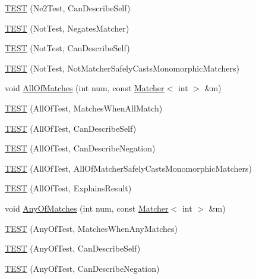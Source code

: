 \begin{DoxyCompactItemize}
\item 
\hyperlink{namespacetesting_1_1gmock__matchers__test_acedf2eda13385067ee70bdb7d6073427}{T\+E\+ST} (Ne2\+Test, Can\+Describe\+Self)
\item 
\hyperlink{namespacetesting_1_1gmock__matchers__test_ab41b57eeaea5568064b6ed3725316c73}{T\+E\+ST} (Not\+Test, Negates\+Matcher)
\item 
\hyperlink{namespacetesting_1_1gmock__matchers__test_a831db2bf90c3950953cdceaefebddd40}{T\+E\+ST} (Not\+Test, Can\+Describe\+Self)
\item 
\hyperlink{namespacetesting_1_1gmock__matchers__test_a46849e0c019e331f830ed91137fa417a}{T\+E\+ST} (Not\+Test, Not\+Matcher\+Safely\+Casts\+Monomorphic\+Matchers)
\item 
void \hyperlink{namespacetesting_1_1gmock__matchers__test_a51d8731c3824a6acdaa594645dd46779}{All\+Of\+Matches} (int num, const \hyperlink{classtesting_1_1Matcher}{Matcher}$<$ int $>$ \&m)
\item 
\hyperlink{namespacetesting_1_1gmock__matchers__test_a7714d041eb2dd2e233db7f175fedef5a}{T\+E\+ST} (All\+Of\+Test, Matches\+When\+All\+Match)
\item 
\hyperlink{namespacetesting_1_1gmock__matchers__test_a31056975d89eea2786997cf18b086bf4}{T\+E\+ST} (All\+Of\+Test, Can\+Describe\+Self)
\item 
\hyperlink{namespacetesting_1_1gmock__matchers__test_a86c15b3bc163321c7a56aeb0b1709b87}{T\+E\+ST} (All\+Of\+Test, Can\+Describe\+Negation)
\item 
\hyperlink{namespacetesting_1_1gmock__matchers__test_a4196a4000390e2378954d55b4f6d2893}{T\+E\+ST} (All\+Of\+Test, All\+Of\+Matcher\+Safely\+Casts\+Monomorphic\+Matchers)
\item 
\hyperlink{namespacetesting_1_1gmock__matchers__test_a2b9f4a791dd4f1fb9f8a1400883a5db4}{T\+E\+ST} (All\+Of\+Test, Explains\+Result)
\item 
void \hyperlink{namespacetesting_1_1gmock__matchers__test_aa4e9deb0a98413e62516451e7c060c7a}{Any\+Of\+Matches} (int num, const \hyperlink{classtesting_1_1Matcher}{Matcher}$<$ int $>$ \&m)
\item 
\hyperlink{namespacetesting_1_1gmock__matchers__test_a4949d40a1ac77182274189c21848af00}{T\+E\+ST} (Any\+Of\+Test, Matches\+When\+Any\+Matches)
\item 
\hyperlink{namespacetesting_1_1gmock__matchers__test_a00bd490bf974b3f3485a1b0fde9fa490}{T\+E\+ST} (Any\+Of\+Test, Can\+Describe\+Self)
\item 
\hyperlink{namespacetesting_1_1gmock__matchers__test_acc5e849e0765f00a48581e9480f3c8e2}{T\+E\+ST} (Any\+Of\+Test, Can\+Describe\+Negation)

\end{DoxyCompactItemize}
